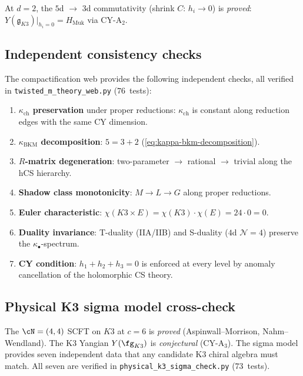 \noindent At $d = 2$, the $5$d $\to$ $3$d commutativity (shrink $C$:
$h_i \to 0$) is \emph{proved}: $Y(\mathfrak{g}_{K3})\big|_{h_i = 0}
= H_{\mathrm{Muk}}$ via CY-A$_2$.

\subsection{Independent consistency checks}
\label{sec:web-consistency-checks}

The compactification web provides the following independent checks,
all verified in \texttt{twisted\_m\_theory\_web.py} ($76$~tests):

\begin{enumerate}
\item \textbf{$\kappa_{\mathrm{ch}}$ preservation} under proper reductions:
  $\kappa_{\mathrm{ch}}$ is constant along reduction edges with the same
  CY dimension.

\item \textbf{$\kappa_{\mathrm{BKM}}$ decomposition}:
  $5 = 3 + 2$ (\eqref{eq:kappa-bkm-decomposition}).

\item \textbf{$R$-matrix degeneration}: two-parameter $\to$ rational
  $\to$ trivial along the hCS hierarchy.

\item \textbf{Shadow class monotonicity}: $M \to L \to G$ along
  proper reductions.

\item \textbf{Euler characteristic}: $\chi(K3 \times E)
  = \chi(K3)\cdot \chi(E) = 24 \cdot 0 = 0$.

\item \textbf{Duality invariance}: T-duality (IIA/IIB) and S-duality
  ($4$d $\mathcal{N}=4$) preserve the $\kappa_\bullet$-spectrum.

\item \textbf{CY condition}: $h_1 + h_2 + h_3 = 0$ is enforced at
  every level by anomaly cancellation of the holomorphic CS theory.
\end{enumerate}

\subsection{Physical K3 sigma model cross-check}
\label{sec:k3-sigma-model-cross-check}

The $\cN = (4,4)$ SCFT on $K3$ at $c = 6$ is \emph{proved}
(Aspinwall--Morrison, Nahm--Wendland).  The K3 Yangian $Y(\fg_{K3})$
is \emph{conjectural} (CY-A$_3$).  The sigma model provides seven
independent data that any candidate K3 chiral algebra must match.
All seven are verified in
\texttt{physical\_k3\_sigma\_check.py} ($73$~tests).

